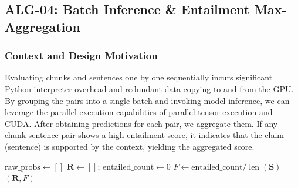 \documentclass[11pt,a4paper]{article}
\theoremstyle{plain}
\theoremstyle{definition}
\theoremstyle{remark}
\begin{document}
\subsection{ALG-04: Batch Inference \& Entailment Max-Aggregation}
\label{subsec:alg04}

\subsubsection{Context and Design Motivation}
Evaluating chunks and sentences one by one sequentially incurs significant Python interpreter overhead and redundant data copying to and from the GPU. By grouping the pairs into a single batch and invoking model inference, we can leverage the parallel execution capabilities of parallel tensor execution and CUDA.
After obtaining predictions for each pair, we aggregate them. If any chunk-sentence pair shows a high entailment score, it indicates that the claim (sentence) is supported by the context, yielding the aggregated score.

\begin{algorithm}[H]
\caption{\textbf{ALG-04}: Batch Inference \& Entailment Max-Aggregation}
\label{alg:batch-inference}
\BlankLine
$\text{raw\_probs} \leftarrow []$\;
$\mathbf{R} \leftarrow []$; $\text{entailed\_count} \leftarrow 0$\;
$F \leftarrow \text{entailed\_count} / \operatorname{len}(\mathbf{S})$\;
\Return $(\mathbf{R}, F)$\;
\end{algorithm}
\end{document}
